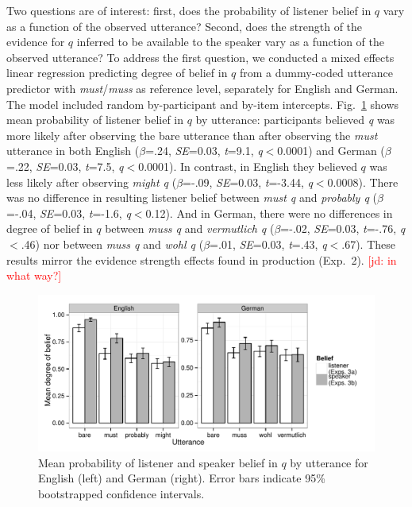 \documentclass[11pt]{article}
\newcommand{\jd}[1]{\textcolor{Red}{[jd: #1]}}
\begin{document}
Two questions are of interest: first, does the probability of listener belief in $q$ vary as a function of the observed utterance? Second, does the strength of the evidence for $q$ inferred to be available to the speaker vary as a function of the observed utterance? To address the first question, we conducted a mixed effects linear regression predicting degree of belief in $q$ from a dummy-coded utterance predictor with \emph{must}/\emph{muss} as reference level, separately for English and German. The model included random by-participant and by-item intercepts. Fig.~\ref{fig:expt3} shows mean probability of listener belief in $q$ by utterance: participants believed \emph{q} was more likely after observing the bare utterance than after observing the \emph{must} utterance in both English  ($\beta$=.24, \emph{SE}=0.03, \emph{t}=9.1, \emph{q}$<$0.0001) and German ($\beta$=.22, \emph{SE}=0.03, \emph{t}=7.5, \emph{q}$<$0.0001). In contrast, in English they believed $q$ was less likely after observing \emph{might q} ($\beta$=-.09, \emph{SE}=0.03, \emph{t}=-3.44, \emph{q}$<$0.0008). There was no difference in resulting listener belief between \emph{must q} and \emph{probably q} ($\beta$=-.04, \emph{SE}=0.03, \emph{t}=-1.6, \emph{q}$<$0.12). And in German, there were no differences in degree of belief in $q$ between \emph{muss q} and \emph{vermutlich q} ($\beta$=-.02, \emph{SE}=0.03, \emph{t}=-.76, \emph{q}$<$.46) nor between \emph{muss q} and \emph{wohl q} ($\beta$=.01, \emph{SE}=0.03, \emph{t}=.43, \emph{q}$<$.67). These results mirror the evidence strength effects found in production (Exp.~2). \jd{in what way?}

\begin{figure}
	\centering
	\includegraphics[width=\textwidth]{pics/mean-beliefs}
	\caption{Mean probability of listener and speaker belief in $q$ by utterance for English (left) and German (right). Error bars indicate 95\% bootstrapped confidence intervals.}
	\label{fig:expt3}
\end{figure}
\end{document}
